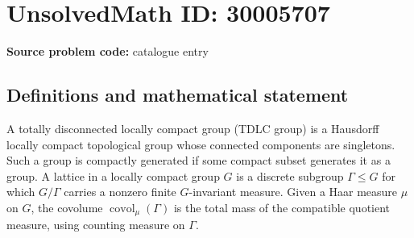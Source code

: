 \documentclass[11pt]{article}
\begin{document}
\section*{UnsolvedMath ID: 30005707}
\textbf{Source problem code:} catalogue entry
\subsection{Definitions and mathematical statement}
A totally disconnected locally compact group (TDLC group) is a Hausdorff locally compact topological group whose connected components are singletons. Such a group is compactly generated if some compact subset generates it as a group. A lattice in a locally compact group \(G\) is a discrete subgroup \(\Gamma\leq G\) for which \(G/\Gamma\) carries a nonzero finite \(G\)-invariant measure. Given a Haar measure \(\mu\) on \(G\), the covolume \(\operatorname{covol}_{\mu}(\Gamma)\) is the total mass of the compatible quotient measure, using counting measure on \(\Gamma\).
\end{document}
